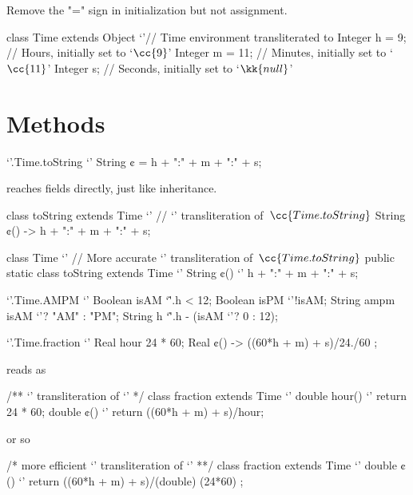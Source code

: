 Remove the "=" sign in initialization but not assignment.
\begin{java}
class Time extends Object {`'// Time environment transliterated to \Java
  Integer h = 9; // Hours, initially set to `$\cc{9}$'
  Integer m = 11; // Minutes, initially set to `$\cc{11}$'
  Integer s; // Seconds, initially set to `$\kk{null}$'
}
\end{java}

\section{Methods}
\begin{reap}
`'.Time.toString {`'
  String ¢ = h + ":" + m + ":" + s;
}
\end{reap}
reaches fields directly, just like inheritance.

\begin{java}
class toString extends Time {`' // `\Java' transliteration of~$\cc{Time.toString}$
  String ¢() -> h + ":" + m + ":" + s;
}
\end{java}

\begin{java}
class Time {`' // More accurate `\Java' transliteration of~$\cc{Time.toString}$
  public static class toString extends Time {`'
    String ¢() {`'
       h + ":" + m + ":" + s;
    }
  }
}
\end{java}

\begin{reap}
`'.Time.AMPM {`'
  Boolean isAM `\^'.h < 12;
  Boolean isPM `'!isAM;
  String ampm isAM `'? "AM" : "PM";
  String h `\^'.h - (isAM `'? 0 : 12);
}
\end{reap}

\begin{reap}
`'.Time.fraction {`'
  Real hour 24 * 60;
  Real ¢() -> ((60*h + m) + s)/24./60 ;
}
\end{reap}
reads as
\begin{java}
/** `\Java' transliteration of `'
*/
class fraction extends Time {`'
  double hour() {`' return 24 * 60; }
  double ¢() {`' return ((60*h + m) + s)/hour; }
}
\end{java}
or so
\begin{java}
/* more efficient `\Java' transliteration of `'
**/
class fraction extends Time {`'
  double ¢() {`' return ((60*h + m) + s)/(double) (24*60) ; }
}
\end{java}

